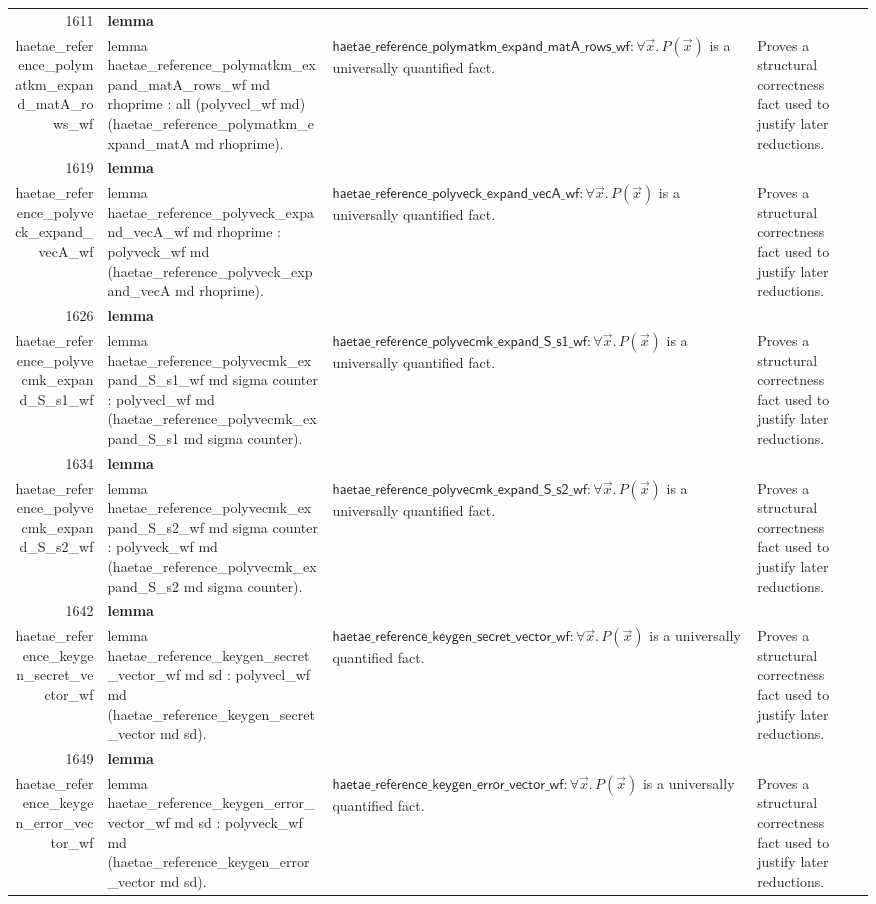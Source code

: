 \documentclass[10pt]{article}
\newcommand{\ec}[1]{\begingroup\ttfamily\scriptsize #1\endgroup}
\begin{document}
\begin{longtable}{r L{0.17\textwidth} L{0.26\textwidth} L{0.27\textwidth} L{0.20\textwidth}}
1611 & \textbf{lemma}\\\ec{haetae\_reference\_polymatkm\_expand\_matA\_rows\_wf} & \ec{lemma haetae\_reference\_polymatkm\_expand\_matA\_rows\_wf md rhoprime : all (polyvecl\_wf md) (haetae\_reference\_polymatkm\_expand\_matA md rhoprime).} & \(\mathsf{haetae\_reference\_polymatkm\_expand\_matA\_rows\_wf} : \forall \vec{x}.\, P(\vec{x})\) is a universally quantified fact. & Proves a structural correctness fact used to justify later reductions. \\
1619 & \textbf{lemma}\\\ec{haetae\_reference\_polyveck\_expand\_vecA\_wf} & \ec{lemma haetae\_reference\_polyveck\_expand\_vecA\_wf md rhoprime : polyveck\_wf md (haetae\_reference\_polyveck\_expand\_vecA md rhoprime).} & \(\mathsf{haetae\_reference\_polyveck\_expand\_vecA\_wf} : \forall \vec{x}.\, P(\vec{x})\) is a universally quantified fact. & Proves a structural correctness fact used to justify later reductions. \\
1626 & \textbf{lemma}\\\ec{haetae\_reference\_polyvecmk\_expand\_S\_s1\_wf} & \ec{lemma haetae\_reference\_polyvecmk\_expand\_S\_s1\_wf md sigma counter : polyvecl\_wf md (haetae\_reference\_polyvecmk\_expand\_S\_s1 md sigma counter).} & \(\mathsf{haetae\_reference\_polyvecmk\_expand\_S\_s1\_wf} : \forall \vec{x}.\, P(\vec{x})\) is a universally quantified fact. & Proves a structural correctness fact used to justify later reductions. \\
1634 & \textbf{lemma}\\\ec{haetae\_reference\_polyvecmk\_expand\_S\_s2\_wf} & \ec{lemma haetae\_reference\_polyvecmk\_expand\_S\_s2\_wf md sigma counter : polyveck\_wf md (haetae\_reference\_polyvecmk\_expand\_S\_s2 md sigma counter).} & \(\mathsf{haetae\_reference\_polyvecmk\_expand\_S\_s2\_wf} : \forall \vec{x}.\, P(\vec{x})\) is a universally quantified fact. & Proves a structural correctness fact used to justify later reductions. \\
1642 & \textbf{lemma}\\\ec{haetae\_reference\_keygen\_secret\_vector\_wf} & \ec{lemma haetae\_reference\_keygen\_secret\_vector\_wf md sd : polyvecl\_wf md (haetae\_reference\_keygen\_secret\_vector md sd).} & \(\mathsf{haetae\_reference\_keygen\_secret\_vector\_wf} : \forall \vec{x}.\, P(\vec{x})\) is a universally quantified fact. & Proves a structural correctness fact used to justify later reductions. \\
1649 & \textbf{lemma}\\\ec{haetae\_reference\_keygen\_error\_vector\_wf} & \ec{lemma haetae\_reference\_keygen\_error\_vector\_wf md sd : polyveck\_wf md (haetae\_reference\_keygen\_error\_vector md sd).} & \(\mathsf{haetae\_reference\_keygen\_error\_vector\_wf} : \forall \vec{x}.\, P(\vec{x})\) is a universally quantified fact. & Proves a structural correctness fact used to justify later reductions. \\

\end{longtable}
\end{document}
